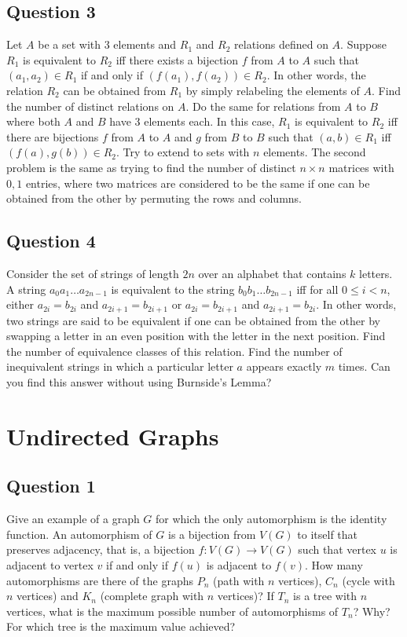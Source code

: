 \documentclass[12pt]{report}
\begin{document}
\section*{Question 3}
Let $A$ be a set with 3 elements and $R_{1}$ and $R_{2}$ relations defined on $A$. Suppose $R_{1}$ is equivalent to $R_{2}$ iff there exists a bijection $f$ from $A$ to $A$ such that $(a_{1}, a_{2}) \in R_{1}$ if and only if $(f(a_{1}), f(a_{2})) \in R_{2}$. In other words, the relation $R_{2}$ can be obtained from $R_{1}$ by simply relabeling the elements of $A$. Find the number of distinct relations on $A$. Do the same for relations from $A$ to $B$ where both $A$ and $B$ have 3 elements each. In this case, $R_{1}$ is equivalent to $R_{2}$ iff there are bijections $f$ from $A$ to $A$ and $g$ from $B$ to $B$ such that $(a, b) \in R_{1}$ iff $(f(a), g(b)) \in R_{2}$. Try to extend to sets with $n$ elements. The second problem is the same as trying to find the number of distinct $n \times n$ matrices with $0, 1$ entries, where two matrices are considered to be the same if one can be obtained from the other by permuting the rows and columns.
\section*{Question 4}
Consider the set of strings of length $2n$ over an alphabet that contains $k$ letters. A string $a_{0}a_{1}\dots a_{2n - 1}$ is equivalent to the string $b_{0}b_{1}\dots b_{2n - 1}$ iff for all $0 \leq i < n$, either $a_{2i} = b_{2i}$ and $a_{2i + 1} = b_{2i + 1}$ or $a_{2i} = b_{2i + 1}$ and $a_{2i + 1} = b_{2i}$. In other words, two strings are said to be equivalent if one can be obtained from the other by swapping a letter in an even position with the letter in the next position. Find the number of equivalence classes of this relation. Find the number of inequivalent strings in which a particular letter $a$ appears exactly $m$ times. Can you find this answer without using Burnside's Lemma?
\chapter{Undirected Graphs}
\section*{Question 1}
Give an example of a graph $G$ for which the only automorphism is the identity function. An automorphism of $G$ is a bijection from $V(G)$ to itself that preserves adjacency, that is, a bijection $f: V(G) \rightarrow V(G)$ such that vertex $u$ is adjacent to vertex $v$ if and only if $f(u)$ is adjacent to $f(v)$. How many automorphisms are there of the graphs $P_{n}$ (path with $n$ vertices), $C_{n}$ (cycle with $n$ vertices) and $K_{n}$ (complete graph with $n$ vertices)? If $T_{n}$ is a tree with $n$ vertices, what is the maximum possible number of automorphisms of $T_{n}$? Why? For which tree is the maximum value achieved?
\end{document}
